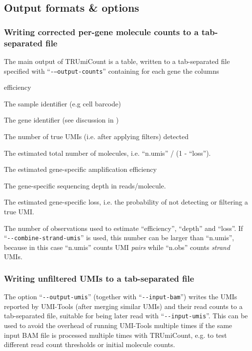 \documentclass{scrartcl}
\makeatletter
\let\subsection@phlo\subsection
\renewcommand\subsection{\needspace{5\baselineskip}\subsection@phlo}
\newcommand{\ddarg}[1]{\texttt{-{}-#1}}
\DeclareRobustCommand*{\nameref}[1]{%
      \textit{\my@nameref{#1}}%
    }%
\makeatother
\begin{document}
\subsection{Output formats \& options}\label{output-options}

\subsubsection*{Writing corrected per-gene molecule counts to a tab-separated file}

\begin{sloppypar}
The main output of TRUmiCount is a table, written to a tab-separated file specified with ``\ddarg{--output-counts}'' containing for each gene the columns
\begin{labeling}[:]{efficiency\ }
\item[sample] The sample identifier (e.g cell barcode)
\item[gene] The gene identifier (see discussion in \nameref{input-bam})
\item[n.umis] The number of true UMIs (i.e. after applying filters) detected
\item[n.tot] The estimated total number of molecules, i.e. ``n.umis'' / (1 - ``loss'').
\item[efficiency] The estimated gene-specific amplification efficiency
\item[depth] The gene-specific sequencing depth in reads/molecule.
\item[loss] The estimated gene-specific loss, i.e. the probability of not detecting or filtering a true UMI. 
\item[n.obs] The number of observations used to estimate ``efficiency'', ``depth'' and ``loss''. If ``\ddarg{combine-strand-umis}'' is used, this number can be larger than ``n.umis'', because in this case ``n.umis'' counts UMI \emph{pairs} while ``n.obs'' counts \emph{strand} UMIs.
\end{labeling}
\end{sloppypar}

\subsubsection*{Writing unfiltered UMIs to a tab-separated file }

The option ``\ddarg{output-umis}'' (together with ``\ddarg{input-bam}'') writes the UMIs reported by UMI-Tools (after merging similar UMIs) and their read counts to a tab-separated file, suitable for being later read with ``\ddarg{input-umis}''. This can be used to avoid the overhead of running UMI-Tools multiple times if the same input BAM file is processed multiple times with TRUmiCount, e.g. to test different read count thresholds or initial molecule counts.
\end{document}
